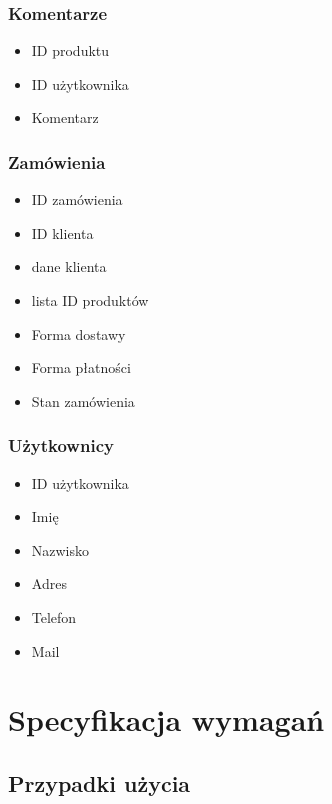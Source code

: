\documentclass[pdflatex,11pt]{aghdpl}
\begin{document}
\subsection{Komentarze}
\begin{itemize}
\item ID produktu
\item ID użytkownika
\item Komentarz
\end{itemize}

\subsection{Zamówienia}
\begin{itemize}
\item ID zamówienia
\item ID klienta
\item dane klienta
\item lista ID produktów
\item Forma dostawy
\item Forma płatności
\item Stan zamówienia
\end{itemize}

\subsection{Użytkownicy}
\begin{itemize}
\item ID użytkownika
\item Imię
\item Nazwisko
\item Adres
\item Telefon
\item Mail
\end{itemize}



\chapter{Specyfikacja wymagań}

\section{Przypadki użycia}
\end{document}
